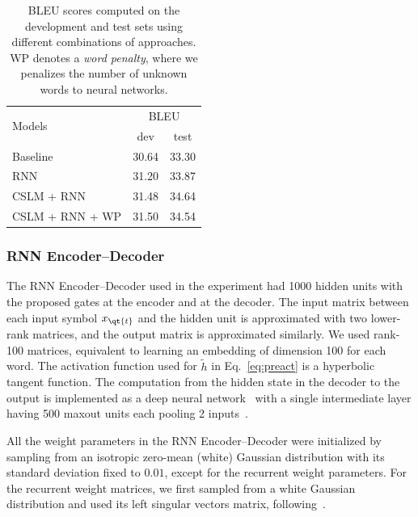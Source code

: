 \begin{table}
    \centering
    \begin{tabular}{l | c | c}
        \multirow{2}{*}{Models} & \multicolumn{2}{|c}{BLEU} \\
        & dev & test \\
        \hline\hline
        Baseline            & 30.64         & 33.30 \\
        RNN                 & 31.20         & 33.87 \\
        CSLM + RNN          & 31.48         & 34.64 \\
        CSLM + RNN + WP     & 31.50         & 34.54 \\
    \end{tabular}
    \caption{BLEU scores computed on the development and test sets using
        different combinations of approaches. WP denotes a \textit{word
        penalty}, where we penalizes the number of unknown words to neural
    networks.}
    \label{tab:result}
    \vspace{-3mm}
\end{table}

\subsubsection{RNN Encoder--Decoder}

The RNN Encoder--Decoder used in the experiment had 1000 hidden units with the
proposed gates at the encoder and at the decoder. The input matrix between
each input symbol $x_{\qt{t}}$ and the hidden unit is approximated with two
lower-rank matrices, and the output matrix is approximated similarly. We used
rank-100 matrices, equivalent to learning an embedding of dimension 100 for each word. 
The activation function used for $\tilde{h}$ in
Eq.~\eqref{eq:preact} is a hyperbolic tangent function.  The computation from
the hidden state in the decoder to the output is implemented as a deep neural
network~\mbox{\cite{Pascanu2014rec}} with a single intermediate layer having 500 maxout
units each pooling 2 inputs~\mbox{\cite{Goodfellow_maxout_2013}}. 

All the weight parameters in the RNN Encoder--Decoder were initialized by
sampling from an isotropic zero-mean (white) Gaussian distribution with its
standard deviation fixed to $0.01$, except for the recurrent weight parameters.
For the recurrent weight matrices, we first sampled from a white Gaussian
distribution and used its left singular vectors matrix,
following~\mbox{\cite{Saxe2014}}.

